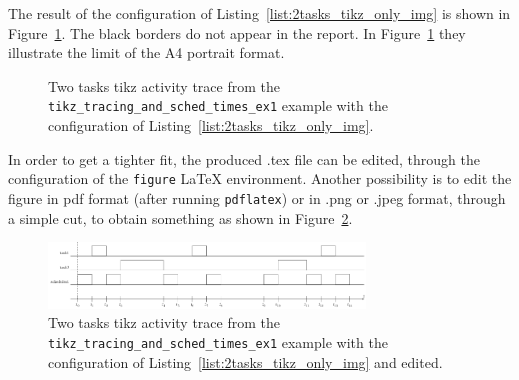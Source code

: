 The result of the configuration of Listing~\ref{list:2tasks_tikz_only_img} is shown in Figure~\ref{fig:2tasks_tikz_only_img}.
The black borders do not appear in the report.
In Figure~\ref{fig:2tasks_tikz_only_img} they illustrate the limit of the A4 portrait format.
 
\begin{figure}[htbp]
\centering
\caption{Two tasks tikz activity trace from the \texttt{tikz\_tracing\_and\_sched\_times\_ex1} example with the configuration of Listing~\ref{list:2tasks_tikz_only_img}.} 
\label{fig:2tasks_tikz_only_img}
\end{figure}

In order to get a tighter fit, the produced .tex file can be edited, through the configuration of the \texttt{figure} LaTeX environment.
%
Another possibility is to edit the figure in pdf format (after running \texttt{pdflatex})
or in .png or .jpeg format, through a simple cut,
to obtain something as shown in Figure~\ref{fig:2tasks_tikz_only_img_ed}.

\begin{figure}[htbp]
\centering
\includegraphics[width=0.75\textwidth]{./figs/2tasks_tikz_only_img_ed.png} 
\caption{Two tasks tikz activity trace from the \texttt{tikz\_tracing\_and\_sched\_times\_ex1} example with the configuration of Listing~\ref{list:2tasks_tikz_only_img} and edited.} 
\label{fig:2tasks_tikz_only_img_ed}
\end{figure}

